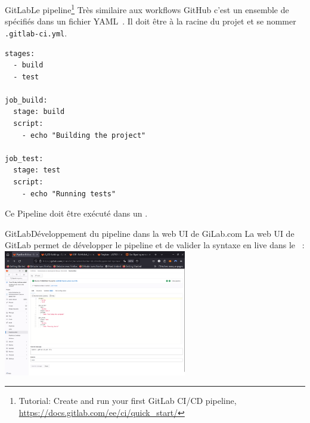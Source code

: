 \documentclass{beamer}
\begin{document}
    \begin{frame}[fragile]{GitLab}{Le pipeline\footnote{Tutorial: Create and run your first GitLab CI/CD pipeline, \url{https://docs.gitlab.com/ee/ci/quick_start/}}}
        \transdissolve
        Très similaire aux workflows GitHub c'est un ensemble de  spécifiés dans un fichier YAML~.
        \bigbreak
        Il doit être à la racine du projet et se nommer \lstinline{.gitlab-ci.yml}.
        \begin{lstlisting}[basicstyle=\ttfamily\tiny]
stages:
  - build
  - test

job_build:
  stage: build
  script:
    - echo "Building the project"

job_test:
  stage: test
  script:
    - echo "Running tests"
        \end{lstlisting}
        Ce Pipeline doit être exécuté dans un .
    \end{frame}

    \begin{frame}{GitLab}{Développement du pipeline dans la web UI de GiLab.com}
        \transdissolve
        La web UI de GitLab permet de développer le pipeline et de valider la syntaxe en live dans le ~:
        \bigbreak
        \centering
        \includegraphics[width=8cm]{image/gitlab-pipeline-editor}
    \end{frame}
\end{document}
